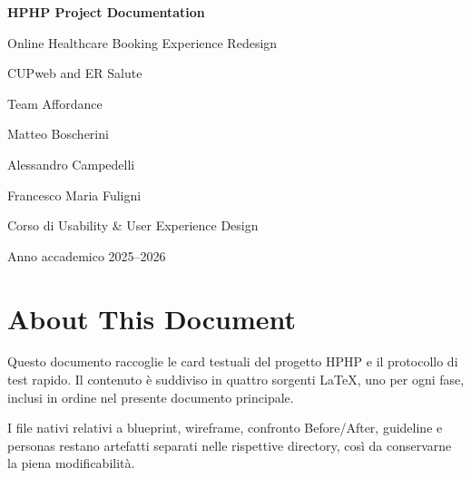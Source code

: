 \documentclass[11pt,a4paper]{article}
\begin{document}
\begin{titlepage}
  \centering
  \vspace*{2.5cm}
  {\Huge\bfseries HPHP Project Documentation\par}
  \vspace{0.8cm}
  {\Large Online Healthcare Booking Experience Redesign\par}
  \vspace{0.5cm}
  {\large CUPweb and ER Salute\par}
  \vfill
  {\large Team Affordance\par}
  \vspace{0.4cm}
  Matteo Boscherini\par
  Alessandro Campedelli\par
  Francesco Maria Fuligni\par
  \vfill
  Corso di Usability \& User Experience Design\par
  Anno accademico 2025--2026\par
\end{titlepage}

\section{About This Document}

Questo documento raccoglie le card testuali del progetto HPHP e il protocollo di test rapido. Il contenuto è suddiviso in quattro sorgenti LaTeX, uno per ogni fase, inclusi in ordine nel presente documento principale.

I file nativi relativi a blueprint, wireframe, confronto Before/After, guideline e personas restano artefatti separati nelle rispettive directory, così da conservarne la piena modificabilità.

\tableofcontents





\end{document}
